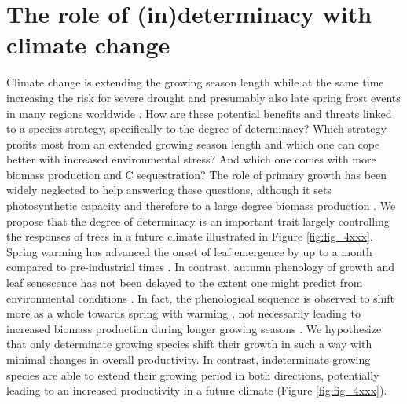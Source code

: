 \documentclass{article}
\begin{document}
	
\section*{The role of (in)determinacy with climate change} %
Climate change is extending the growing season length while at the same time increasing the risk for severe drought \citep{haoChangesSeverityCompound2018} and presumably also late spring frost events in many regions worldwide \citep{zohnerLatespringFrostRisk2020}. How are these potential benefits and threats linked to a species strategy, specifically to the degree of determinacy? Which strategy profits most from an extended growing season length and which one can cope better with increased environmental stress? And which one comes with more biomass production and C sequestration? The role of primary growth has been widely neglected to help answering these questions, although it sets photosynthetic capacity and therefore to a large degree biomass production \citep{girardPolycyclismFundamentalTree2011}. We propose that the degree of determinacy is an important trait largely controlling the responses of trees in a future climate illustrated in Figure \ref{fig:fig_4xxx}. \\

Spring warming has advanced the onset of leaf emergence by up to a month compared to pre-industrial times \citep{vitasseGreatAccelerationPlant2022b}. In contrast, autumn phenology of growth and leaf senescence has not been delayed to the extent one might predict from environmental conditions \citep{zaniIncreasedGrowingseasonProductivity2020b, zohnerEffectClimateWarming2023}. In fact, the phenological sequence is observed to shift more as a whole towards spring with warming \citep{keenanTimingAutumnSenescence2015b}, not necessarily leading to increased biomass production during longer growing seasons \citep{zaniIncreasedGrowingseasonProductivity2020b}. We hypothesize that only determinate growing species shift their growth in such a way with minimal changes in overall productivity. In contrast, indeterminate growing species are able to extend their growing period in both directions, potentially leading to an increased productivity in a future climate (Figure \ref{fig:fig_4xxx}). \\
\end{document}
